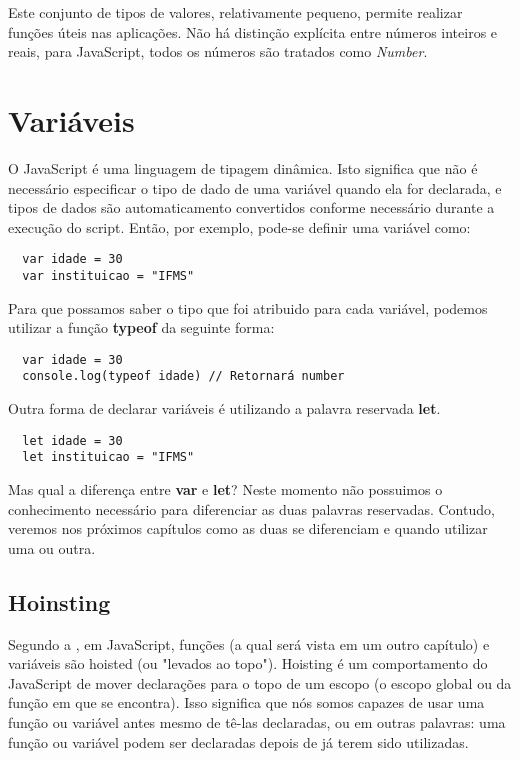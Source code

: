Este conjunto de tipos de valores, relativamente pequeno, permite realizar funções úteis nas aplicações. Não há distinção explícita entre números inteiros e reais, para JavaScript, todos os números são tratados como \textit{Number}. 

\section{Variáveis}

O JavaScript é uma linguagem de tipagem dinâmica. Isto significa que não é necessário especificar o tipo de dado de uma variável quando ela for declarada, e tipos de dados são automaticamento convertidos conforme necessário durante a execução do script. Então, por exemplo, pode-se definir uma variável como:

\begin{lstlisting}
  var idade = 30
  var instituicao = "IFMS" 
\end{lstlisting}

Para que possamos saber o tipo que foi atribuido para cada variável, podemos utilizar a função \textbf{typeof} da seguinte forma: 

\begin{lstlisting}
  var idade = 30
  console.log(typeof idade) // Retornará number
\end{lstlisting}

Outra forma de declarar variáveis é utilizando a palavra reservada \textbf{let}.

\begin{lstlisting}
  let idade = 30
  let instituicao = "IFMS" 
\end{lstlisting} 

Mas qual a diferença entre \textbf{var} e \textbf{let}? Neste momento não possuimos o conhecimento necessário para diferenciar as duas palavras reservadas. Contudo, veremos nos próximos capítulos como as duas se diferenciam e quando utilizar uma ou outra.

\subsection{Hoinsting}

Segundo a , em JavaScript, funções (a qual será vista em um outro capítulo) e variáveis são hoisted (ou "levados ao topo"). Hoisting é um comportamento do JavaScript de mover declarações para o topo de um escopo (o escopo global ou da função em que se encontra). Isso significa que nós somos capazes de usar uma função ou variável antes mesmo de tê-las declaradas, ou em outras palavras: uma função ou variável podem ser declaradas depois de já terem sido utilizadas.

